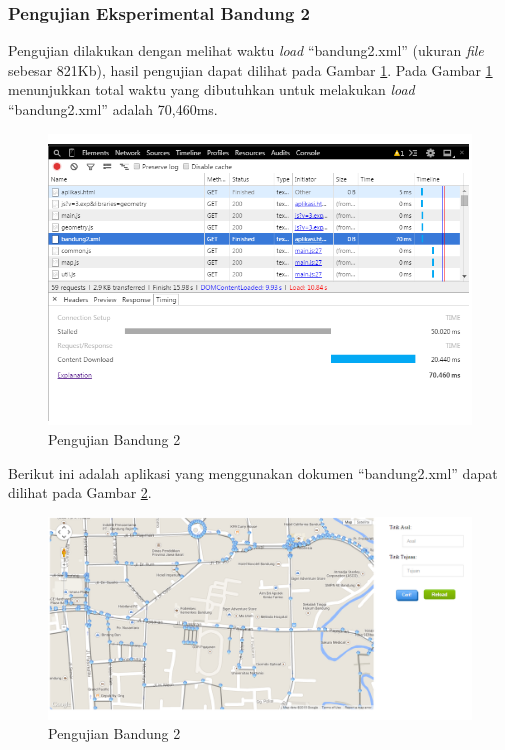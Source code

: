 \subsubsection{Pengujian Eksperimental Bandung 2}
Pengujian dilakukan dengan melihat waktu \textit{load} ``bandung2.xml'' (ukuran
\textit{file} sebesar 821Kb), hasil pengujian dapat dilihat pada Gambar
\ref{fig:pu_bandung2}. Pada Gambar \ref{fig:pu_bandung2} menunjukkan total waktu yang dibutuhkan untuk 
melakukan \textit{load} ``bandung2.xml'' adalah 70,460ms. 
\begin{figure}[h]
\centering
\includegraphics[scale=0.8]{Gambar/pu_bandung2}
\caption[Pengujian Bandung 2]{Pengujian Bandung 2}
\label{fig:pu_bandung2}
\end{figure}
Berikut ini adalah aplikasi yang menggunakan dokumen ``bandung2.xml'' dapat
dilihat pada Gambar \ref{fig:bandung2_load}.
\begin{figure}[h]
\centering
\includegraphics[scale=0.45]{Gambar/bandung2_load}
\caption[Pengujian Bandung 2]{Pengujian Bandung 2}
\label{fig:bandung2_load}
\end{figure}

